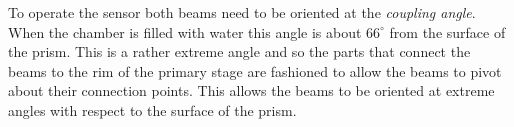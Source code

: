 To operate the sensor both beams need to be oriented at the \textit{coupling angle}. When the chamber is filled with water this angle is about $66^{\circ}$ from the surface of the prism. This is a rather extreme angle and so the parts that connect the beams to the rim of the primary stage are fashioned to allow the beams to pivot about their connection points. This allows the beams to be oriented at extreme angles with respect to the surface of the prism.
